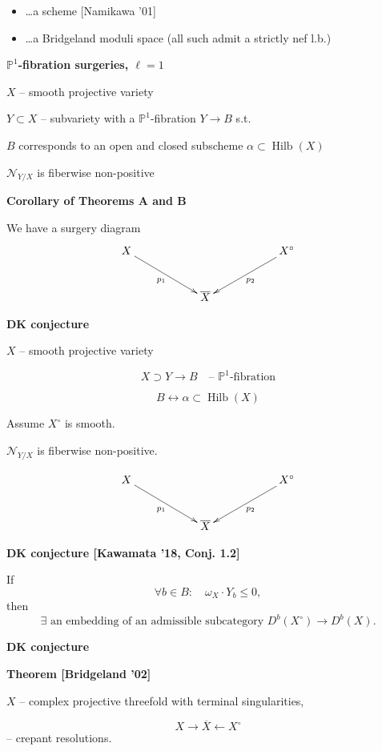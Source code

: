 \begin{itemize}
\item \ldots a scheme [Namikawa '01]

\item \ldots a Bridgeland moduli space
(all such admit a strictly nef l.b.)
\end{itemize}

\medskip\noindent
{\bf $\mathbb P^1$-fibration surgeries,
$\ell=1$}

$X$ -- smooth projective variety

$Y\subset X$ -- subvariety with a
$\mathbb P^1$-fibration
$Y\longrightarrow B$ s.t.

$B$ corresponds to an open and closed
subscheme
$\alpha\subset\operatorname{Hilb}(X)$

$\mathcal N_{Y/X}$ is fiberwise
non-positive

\medskip\noindent
{\bf Corollary of Theorems A and B}

We have a surgery diagram
$$
\xymatrix@C=55pt@R=28pt{
X\ar[dr]_{p_1}
&&
X^\circ\ar[dl]^{p_2}
\\
&
\overline X
&
}
$$

\medskip\noindent
{\bf DK conjecture}

$X$ -- smooth projective variety

$$
X\supset Y\longrightarrow B
\quad\text{-- $\mathbb P^1$-fibration}
$$

$$
B\longleftrightarrow
\alpha\subset\operatorname{Hilb}(X)
$$

Assume $X^\circ$ is smooth.

$\mathcal N_{Y/X}$ is fiberwise
non-positive.

$$
\xymatrix@C=55pt@R=28pt{
X\ar[dr]_{p_1}
&&
X^\circ\ar[dl]^{p_2}
\\
&
\overline X
&
}
$$

\medskip\noindent
{\bf DK conjecture
[Kawamata '18, Conj. 1.2]}

If
$$
\forall b\in B:
\quad
\omega_X\cdot Y_b\leq 0,
$$
then
$$
\exists\text{ an embedding of an
admissible subcategory }
D^b(X^\circ)\longrightarrow D^b(X).
$$

\medskip\noindent
{\bf DK conjecture}

\medskip\noindent
{\bf Theorem [Bridgeland '02]}

$X$ -- complex projective threefold with
terminal singularities,

$$
X\longrightarrow\overline X
\longleftarrow X^\circ
$$
-- crepant resolutions.

